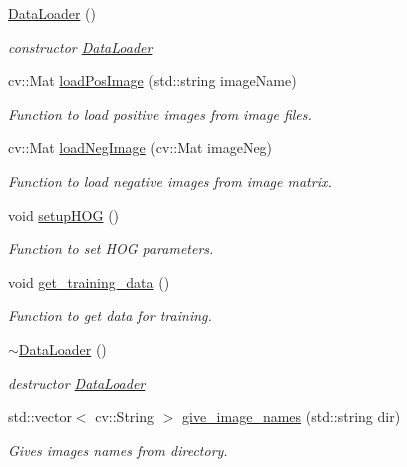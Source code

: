 \begin{DoxyCompactItemize}
\item 
\hyperlink{classDataLoader_a1e3bfa6d0116f0ecc8ec4596e35a09f0}{Data\+Loader} ()
\begin{DoxyCompactList}\small\item\em constructor \hyperlink{classDataLoader}{Data\+Loader} \end{DoxyCompactList}\item 
cv\+::\+Mat \hyperlink{classDataLoader_aae69b02ceabe6b1d858f3e5dca8d8bbe}{load\+Pos\+Image} (std\+::string image\+Name)
\begin{DoxyCompactList}\small\item\em Function to load positive images from image files. \end{DoxyCompactList}\item 
cv\+::\+Mat \hyperlink{classDataLoader_afbd04a134d7e4fc255992f1798f7f5e3}{load\+Neg\+Image} (cv\+::\+Mat image\+Neg)
\begin{DoxyCompactList}\small\item\em Function to load negative images from image matrix. \end{DoxyCompactList}\item 
void \hyperlink{classDataLoader_a488826f750baad653d212a8e9db9a170}{setup\+H\+OG} ()
\begin{DoxyCompactList}\small\item\em Function to set H\+OG parameters. \end{DoxyCompactList}\item 
void \hyperlink{classDataLoader_a200d198bc79dac47bf11020628500c0d}{get\+\_\+training\+\_\+data} ()
\begin{DoxyCompactList}\small\item\em Function to get data for training. \end{DoxyCompactList}\item 
\hyperlink{classDataLoader_a30951bb663d7a5ff79a4443de0f943ed}{$\sim$\+Data\+Loader} ()
\begin{DoxyCompactList}\small\item\em destructor \hyperlink{classDataLoader}{Data\+Loader} \end{DoxyCompactList}\item 
std\+::vector$<$ cv\+::\+String $>$ \hyperlink{classDataLoader_a5f7a483276b576f2b3d4f635a2c10df9}{give\+\_\+image\+\_\+names} (std\+::string dir)
\begin{DoxyCompactList}\small\item\em Gives images names from directory. \end{DoxyCompactList}\end{DoxyCompactItemize}
